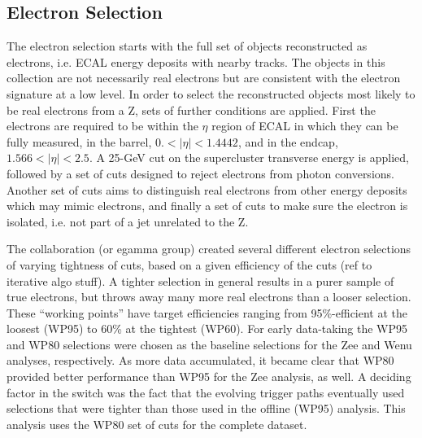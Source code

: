 \subsection{Electron Selection}
\label{evSel:elec}
The electron selection starts with the full set of objects reconstructed as electrons, 
i.e. ECAL energy deposits with nearby tracks.  
The objects in this collection are not necessarily real electrons 
but are consistent with the electron signature at a low level.  
In order to select the reconstructed objects most likely to be real electrons from a Z, 
sets of further conditions are applied.  
First the electrons are required to be within the $\eta$ region of ECAL in which 
they can be fully measured, in the barrel, $0. < |\eta| < 1.4442$, 
and in the endcap, $1.566 < |\eta| < 2.5$.  
A 25-GeV cut on the supercluster transverse energy is applied,
followed by a set of cuts designed to reject electrons from photon conversions.  
Another set of cuts aims to distinguish real electrons from other energy deposits which may mimic electrons, 
and finally a set of cuts to make sure the electron is isolated, i.e. not part of a jet unrelated to the Z.  

The collaboration (or egamma group) created several different electron selections of varying tightness of cuts,
based on a given efficiency of the cuts (ref to iterative algo stuff).  
A tighter selection in general results in a purer sample of true electrons, but throws away many more
real electrons than a looser selection.  
These ``working points'' have target efficiencies ranging from 95\%-efficient at the loosest (WP95) to 60\% at the tightest (WP60).  
For early data-taking the WP95 and WP80 selections were chosen as the baseline selections for the Zee and Wenu analyses, respectively.
As more data accumulated, it became clear that WP80 provided better performance than WP95 for the Zee analysis, as well.  
A deciding factor in the switch was the fact that the evolving trigger paths eventually used selections that were
tighter than those used in the offline (WP95) analysis.  
This analysis uses the WP80 set of cuts for the complete dataset.  


